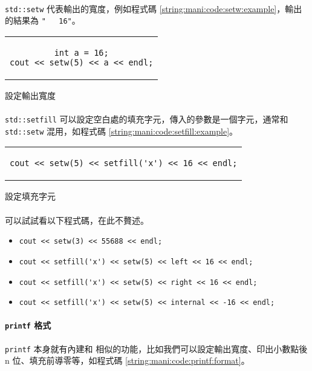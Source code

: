 \documentclass[12pt,a4paper,oneside]{article}
\begin{document}
\begin{CJK}{UTF8}{bkai}
\paragraph{}\lstinline!std::setw! 代表輸出的寬度，例如程式碼 \ref{string:mani:code:setw:example}，輸出的結果為 \lstinline!"   16"!。

\begin{code}[h!]
  \centering
  \begin{tabular}{c}
  \begin{lstlisting}
int a = 16;
cout << setw(5) << a << endl;
  \end{lstlisting}
  \end{tabular}
  \caption{設定輸出寬度}
  \label{string:mani:code:setw:example}
\end{code}

\paragraph{}\lstinline!std::setfill! 可以設定空白處的填充字元，傳入的參數是一個字元，通常和 \lstinline!std::setw! 混用，如程式碼 \ref{string:mani:code:setfill:example}。

\begin{code}[h!]
  \centering
  \begin{tabular}{c}
  \begin{lstlisting}
cout << setw(5) << setfill('x') << 16 << endl;
  \end{lstlisting}
  \end{tabular}
  \caption{設定填充字元}
  \label{string:mani:code:setfill:example}
\end{code}

\paragraph{}可以試試看以下程式碼，在此不贅述。
\begin{itemize}
\item \lstinline!cout << setw(3) << 55688 << endl;!
\item \lstinline!cout << setfill('x') << setw(5) << left << 16 << endl;!
\item \lstinline!cout << setfill('x') << setw(5) << right << 16 << endl;!
\item \lstinline!cout << setfill('x') << setw(5) << internal << -16 << endl;!
\end{itemize}

\paragraph{\lstinline!printf! 格式}\lstinline!printf! 本身就有內建和  相似的功能，比如我們可以設定輸出寬度、印出小數點後 n 位、填充前導零等，如程式碼 \ref{string:mani:code:printf:format}。


\end{CJK}
\end{document}
